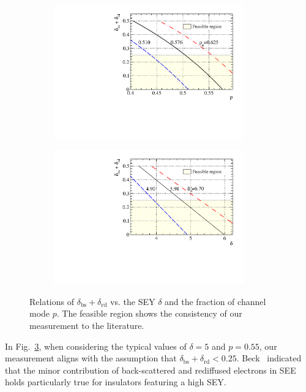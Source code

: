 \begin{figure}[htbp]
	\centering
	\begin{subfigure}{0.5\textwidth}
		\centering
		\includegraphics[width=0.9\textwidth]{PMTRelated/GTmodel/parameter_pp0.pdf}
		\caption{}
		\label{fig:pp0}
	\end{subfigure}%
	\hfill
	\begin{subfigure}{0.5\textwidth}
		\centering
		\includegraphics[width=0.9\textwidth]{PMTRelated/GTmodel/parameters_ts.pdf}
		\caption{}
		\label{fig:tsts}
	\end{subfigure}
	\caption{Relations of \(\delta_\text{bs} + \delta_\text{rd}\) vs. the SEY \(\delta\) and the fraction of channel mode \(p\).
		The feasible region shows the consistency of our measurement to the literature.}
	\label{fig:pdelta}
\end{figure}

In Fig.~\ref{fig:pdelta}, when considering the typical values of \(\delta = 5\) and \(p = 0.55\), our measurement aligns with the assumption that \(\delta_\text{bs}+\delta_\text{rd}<0.25\). Beck~\cite{beck_physical_1966} indicated that the minor contribution of back-scattered and rediffused electrons in SEE holds particularly true for insulators featuring a high SEY.


